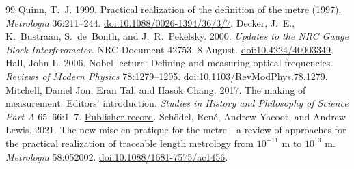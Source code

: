 \documentclass[11pt,a4paper]{article}
\begin{document}
\begin{thebibliography}{99}
 Quinn, T.~J. 1999. Practical realization of the definition of the metre (1997). \emph{Metrologia} 36:211--244. \href{https://doi.org/10.1088/0026-1394/36/3/7}{doi:10.1088/0026-1394/36/3/7}.
 Decker, J.~E., K.~Bustraan, S.~de~Bonth, and J.~R.~Pekelsky. 2000. \emph{Updates to the NRC Gauge Block Interferometer}. NRC Document 42753, 8 August. \href{https://doi.org/10.4224/40003349}{doi:10.4224/40003349}.
 Hall, John L. 2006. Nobel lecture: Defining and measuring optical frequencies. \emph{Reviews of Modern Physics} 78:1279--1295. \href{https://doi.org/10.1103/RevModPhys.78.1279}{doi:10.1103/RevModPhys.78.1279}.
 Mitchell, Daniel Jon, Eran Tal, and Hasok Chang. 2017. The making of measurement: Editors' introduction. \emph{Studies in History and Philosophy of Science Part A} 65--66:1--7. \href{https://www.sciencedirect.com/science/article/abs/pii/S0039368117302339}{Publisher record}.
 Sch\"odel, Ren\'e, Andrew Yacoot, and Andrew Lewis. 2021. The new mise en pratique for the metre---a review of approaches for the practical realization of traceable length metrology from $10^{-11}$ m to $10^{13}$ m. \emph{Metrologia} 58:052002. \href{https://doi.org/10.1088/1681-7575/ac1456}{doi:10.1088/1681-7575/ac1456}.
\end{thebibliography}
\end{document}
